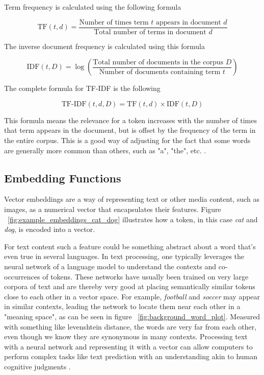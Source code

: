 Term frequency is calculated using the following formula


\begin{equation}
        \text{TF}(t, d) = \frac{\text{Number of times term } t \text{ appears in document } d}{\text{Total number of terms in document } d}
\end{equation}

The inverse document frequency is calculated using this formula


\begin{equation}
        \text{IDF}(t, D) = \log \left(\frac{\text{Total number of documents in the corpus } D}{\text{Number of documents containing term } t}\right)
\end{equation}

The complete formula for TF-IDF is the following


\begin{equation}
        \text{TF-IDF}(t, d, D) = \text{TF}(t, d) \times \text{IDF}(t, D)
\end{equation}


This formula means the relevance for a token increases with the number of times that term appears in the document, but is offset by the frequency of the term in the entire corpus. This is a good way of adjusting for the fact that some words are generally more common than others, such as "a", "the", etc. \cite{christopher_d_introduction_2008}.


\subsection{Embedding Functions}
\label{sec:embedding_functions}


Vector embeddings are a way of representing text or other media content, such as images, as a numerical vector that encapsulates their features. Figure ~\ref{fig:example_embeddings_cat_dog} illustrates how a token, in this case \textit{cat} and \textit{dog}, is encoded into a vector.





For text content such a feature could be something abstract about a word that’s even true in several languages. In text processing, one typically leverages the neural network of a language model to understand the contexts and co-occurrences of tokens. These networks have usually been trained on very large corpora of text and are thereby very good at placing semantically similar tokens close to each other in a vector space. For example, \textit{football} and \textit{soccer} may appear in similar contexts, leading the network to locate them near each other in a "meaning space", as can be seen in figure ~\ref{fig:background_word_plot}. Measured with something like levenshtein distance, the words are very far from each other, even though we know they are synonymous in many contexts. Processing text with a neural network and representing it with a vector can allow computers to perform complex tasks like text prediction with an understanding akin to human cognitive judgments \cite{mikolov_efficient_2013-1}.


